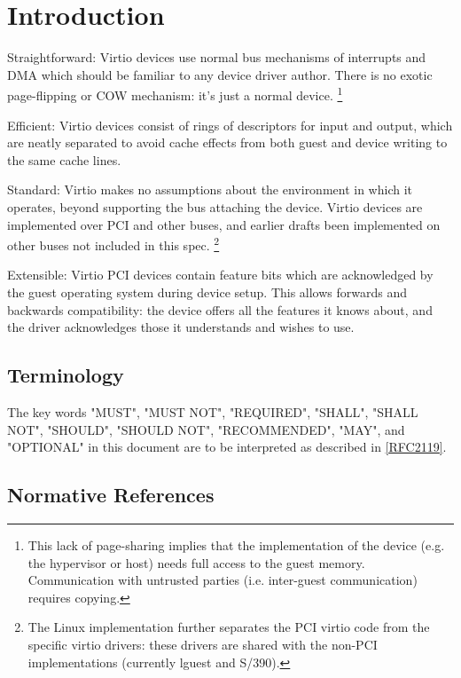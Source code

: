 \chapter{Introduction}



  Straightforward: Virtio devices use normal bus mechanisms of
  interrupts and DMA which should be familiar to any device driver
  author. There is no exotic page-flipping or COW mechanism: it's just
  a normal device.
\footnote{This lack of page-sharing implies that the implementation of the
device (e.g. the hypervisor or host) needs full access to the
guest memory. Communication with untrusted parties (i.e.
inter-guest communication) requires copying.
}

  Efficient: Virtio devices consist of rings of descriptors
  for input and output, which are neatly separated to avoid cache
  effects from both guest and device writing to the same cache
  lines.

  Standard: Virtio makes no assumptions about the environment in which
  it operates, beyond supporting the bus attaching the device.  Virtio
  devices are implemented over PCI and other buses, and earlier drafts
  been implemented on other buses not included in this spec.
\footnote{The Linux implementation further separates the PCI virtio code
from the specific virtio drivers: these drivers are shared with
the non-PCI implementations (currently lguest and S/390).
}

  Extensible: Virtio PCI devices contain feature bits which are
  acknowledged by the guest operating system during device setup.
  This allows forwards and backwards compatibility: the device
  offers all the features it knows about, and the driver
  acknowledges those it understands and wishes to use.

\section{Terminology}\label{Terminology}

The key words "MUST", "MUST NOT", "REQUIRED", "SHALL", "SHALL NOT", "SHOULD", "SHOULD NOT", "RECOMMENDED", "MAY", and "OPTIONAL" in this document are to be interpreted as described in \hyperref[intro:rfc2119]{[RFC2119]}.

\section{Normative References}

